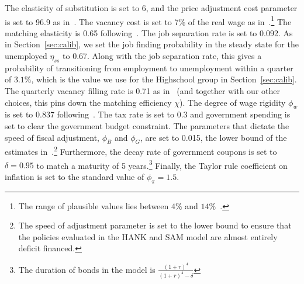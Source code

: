 \documentclass[qe,draft]{econsocart}
\theoremstyle{plain}
\theoremstyle{definition}
\begin{document}
The elasticity of substitution is set to 6, and the price adjustment cost parameter is set to 96.9 as in~\cite{Ravn2017,Ravn2021}.
The vacancy cost is set to 7\% of the real wage as in~\cite{Christiano2016}.\footnote{The range of plausible values lies between $4\%$ and $14\%$~\cite{Silva2009}.} The matching elasticity is 0.65 following~\cite{Ravn2017,Ravn2021}. The job separation rate is set to 0.092. As in Section~\ref{sec:calib}, we set the job finding probability in the steady state for the unemployed $\eta_{ss}$ to 0.67. Along with the job separation rate, this gives a probability of transitioning from employment to unemployment within a quarter of $3.1\%$, which is the value we use for the Highschool group in Section~\ref{sec:calib}. The quarterly vacancy filling rate is 0.71 as in~\cite{DenHaan2000} (and together with our other choices, this pins down the matching efficiency $\chi$). The degree of wage rigidity $\phi_w$ is set to 0.837 following~\cite{Gornemann2021}. The tax rate is set to 0.3 and government spending is set to clear the government budget constraint. The parameters that dictate the speed of fiscal adjustment, $\phi_{B}$ and $\phi_{G}$, are set to 0.015, the lower bound of the estimates in~\cite{arsJumpsHumps}.\footnote{The speed of adjustment parameter is set to the lower bound to ensure that the policies evaluated in the HANK and SAM model are almost entirely deficit financed.} Furthermore, the decay rate of government coupons is set to $\delta = 0.95$ to match a maturity of 5 years.\footnote{The duration of bonds in the model is $\frac{{(1+r)}^4}{{(1+r)}^4 - \delta}$} Finally, the Taylor rule coefficient on inflation is set to the standard value of $\phi_{\pi}=1.5$.





\clearpage
{}


\clearpage


%
%
%
\end{document}
